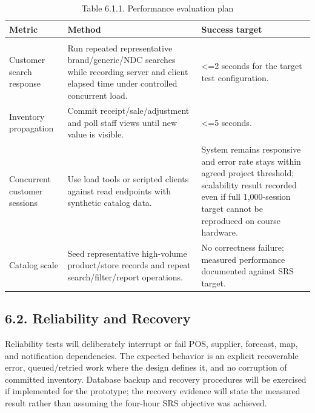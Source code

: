 {\def\LTcaptype{none} %
\begin{longtable}[]{|
  >{\raggedright\arraybackslash}m{}|
  >{\raggedright\arraybackslash}m{}|
  >{\raggedright\arraybackslash}m{}|}
\hline
\begin{minipage}[c]{\linewidth}\raggedright
\textbf{Metric}
\end{minipage} & \begin{minipage}[c]{\linewidth}\raggedright
\textbf{Method}
\end{minipage} & \begin{minipage}[c]{\linewidth}\raggedright
\textbf{Success target}
\end{minipage} \\
\hline
\endhead

\caption*{Table 6.1.1. Performance evaluation plan}\\
\endlastfoot
Customer search response & Run repeated representative brand/generic/NDC searches while recording server and client elapsed time under controlled concurrent load. & \textless=2 seconds for the target test configuration. \\ \hline
Inventory propagation & Commit receipt/sale/adjustment and poll staff views until new value is visible. & \textless=5 seconds. \\ \hline
Concurrent customer sessions & Use load tools or scripted clients against read endpoints with synthetic catalog data. & System remains responsive and error rate stays within agreed project threshold; scalability result recorded even if full 1,000-session target cannot be reproduced on course hardware. \\ \hline
Catalog scale & Seed representative high-volume product/store records and repeat search/filter/report operations. & No correctness failure; measured performance documented against SRS target. \\ \hline
\end{longtable}
}

\subsection{6.2. Reliability and Recovery}\label{reliability-and-recovery}

Reliability tests will deliberately interrupt or fail POS, supplier, forecast, map, and notification dependencies. The expected behavior is an explicit recoverable error, queued/retried work where the design defines it, and no corruption of committed inventory. Database backup and recovery procedures will be exercised if implemented for the prototype; the recovery evidence will state the measured result rather than assuming the four-hour SRS objective was achieved.

